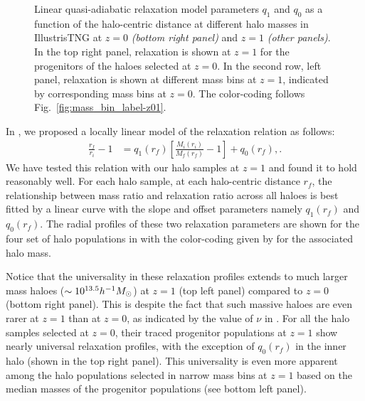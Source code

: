 \begin{figure}[htbp]
\caption{Linear quasi-adiabatic relaxation model parameters $q_1$ and $q_0$ as a function of the halo-centric distance at different halo masses in IllustrisTNG at $z=0$ \emph{(bottom right panel)} and $z=1$ \emph{(other panels)}. In the top right panel, relaxation is shown at $z=1$ for the progenitors of the haloes selected at $z=0$. In the second row, left panel, relaxation is shown at different mass bins at $z=1$, indicated by corresponding mass bins at $z=0$. The color-coding follows Fig.~\ref{fig:mass_bin_label-z01}.}
\label{fig:rf-fit-params}
\end{figure}

In , we proposed a locally linear model of the relaxation relation as follows:
\begin{align}
\label{eq:chi-linear-q0-ch:physvar}
\frac{r_f}{r_i} - 1 &= q_1(r_f) \left[ \frac{M_i(r_i)}{M_f(r_f)} - 1 \right] + q_0(r_f),.
\end{align}
We have tested this relation with our halo samples at $z=1$ and found it to hold reasonably well. For each halo sample, at each halo-centric distance $r_f$, the relationship between mass ratio and relaxation ratio across all haloes is best fitted by a linear curve with the slope and offset parameters namely $q_1(r_f)$ and $q_0(r_f)$. The radial profiles of these two relaxation parameters are shown for the four set of halo populations in  with the color-coding given by  for the associated halo mass.

Notice that the universality in these relaxation profiles extends to much larger mass haloes ($\sim 10^{13.5} h^{-1}M_{\odot}$) at $z=1$ (top left panel) compared to $z=0$ (bottom right panel). This is despite the fact that such massive haloes are even rarer at $z=1$ than at $z=0$, as indicated by the value of $\nu$ in . For all the halo samples selected at $z=0$, their traced progenitor populations at $z=1$ show nearly universal relaxation profiles, with the exception of $q_0(r_f)$ in the inner halo (shown in the top right panel). This universality is even more apparent among the halo populations selected in narrow mass bins at $z=1$ based on the median masses of the progenitor populations (see bottom left panel).

